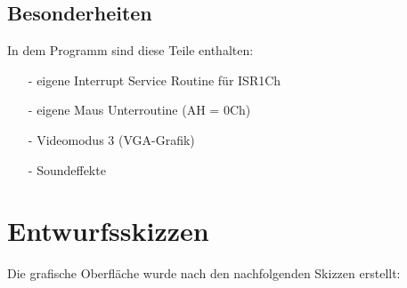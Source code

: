 \documentclass[a4paper,10pt]{article}
\begin{document}
		\subsection{Besonderheiten}
			In dem Programm sind diese Teile enthalten:
			\begin{itemize}
				\item[-] eigene Interrupt Service Routine für ISR1Ch
				\item[-] eigene Maus Unterroutine (AH = 0Ch)
				\item[-] Videomodus 3 (VGA-Grafik)
				\item[-] Soundeffekte
			\end{itemize}
		\newpage
	\section{Entwurfsskizzen}
		
		Die grafische Oberfläche wurde nach den nachfolgenden Skizzen 
		erstellt:\\
		
\end{document}
